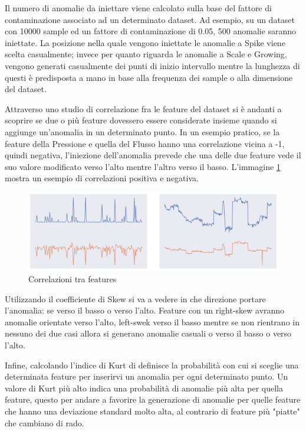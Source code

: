 Il numero di anomalie da iniettare viene calcolato sulla base del fattore di contaminazione associato ad un determinato dataset. Ad esempio, su un dataset con 10000 sample ed un fattore di contaminazione di 0.05, 500 anomalie saranno iniettate.
La posizione nella quale vengono iniettate le anomalie a Spike viene scelta casualmente; invece per quanto riguarda le anomalie a Scale e Growing, vengono generati casualmente dei punti di inizio intervallo mentre la lunghezza di questi è predisposta a mano in base alla frequenza dei sample o alla dimensione del dataset.

Attraverso uno studio di correlazione fra le feature del dataset si è andanti a scoprire se due o più feature dovessero essere considerate insieme quando si aggiunge un'anomalia in un determinato punto. In un esempio pratico, se la feature della Pressione e quella del Flusso hanno una correlazione vicina a -1, quindi negativa, l'iniezione dell'anomalia prevede che una delle due feature vede il suo valore modificato verso l'alto mentre l'altro verso il basso. L'immagine \ref{feature-correlazioni} mostra un esempio di correlazioni positiva e negativa.
\begin{figure}[t]
	\centering
	\includegraphics[width=14cm, scale=1]{images/corr}
	\caption{Correlazioni tra features}
	\label{feature-correlazioni}
		
\end{figure}

Utilizzando il coefficiente di Skew si va a vedere in che direzione portare l'anomalia: se verso il basso o verso l'alto. Feature con un right-skew avranno anomalie orientate verso l'alto, left-swek verso il basso mentre se non rientrano in nessuno dei due casi allora si generano anomalie casuali o verso il basso o verso l'alto.

Infine, calcolando l'indice di Kurt di definisce la probabilità con cui si sceglie una determinata feature per inserirvi un anomalia per ogni determinato punto. Un valore di Kurt più alto indica una probabilità di anomalie più alta per quella feature, questo per andare a favorire la generazione di anomalie per quelle feature che hanno una deviazione standard molto alta, al contrario di feature più "piatte" che cambiano di rado.


